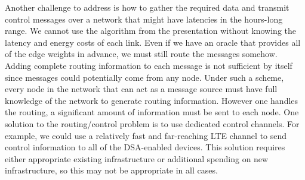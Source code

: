 \documentclass[]{article}
\begin{document}
Another challenge to address is how to gather the required data and transmit control messages over a network that might have latencies in the hours-long range. We cannot use the algorithm from the presentation without knowing the latency and energy costs of each link. Even if we have an oracle that provides all of the edge weights in advance, we must still route the messages somehow. Adding complete routing information to each message is not sufficient by itself since messages could potentially come from any node. Under such a scheme, every node in the network that can act as a message source must have full knowledge of the network to generate routing information. However one handles the routing, a significant amount of information must be sent to each node. One solution to the routing/control problem is to use dedicated control channels.  For example, we could use a relatively fast and far-reaching LTE channel to send control information to all of the DSA-enabled devices. This solution requires either appropriate existing infrastructure or additional spending on new infrastructure, so this may not be appropriate in all cases. 



\end{document}
